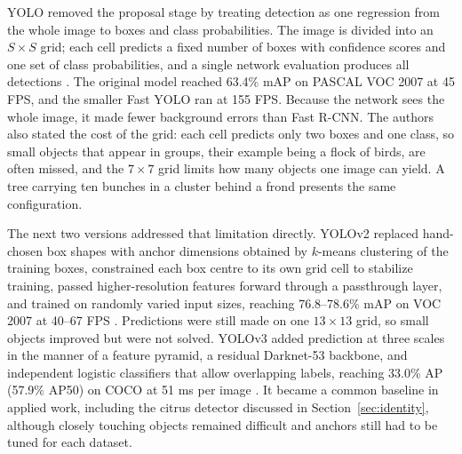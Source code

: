 YOLO removed the proposal stage by treating detection as one regression from the whole image to boxes and class probabilities. The image is divided into an $S\times S$ grid; each cell predicts a fixed number of boxes with confidence scores and one set of class probabilities, and a single network evaluation produces all detections \cite{redmon2016yolo}. The original model reached 63.4\% mAP on PASCAL VOC 2007 at 45 FPS, and the smaller Fast YOLO ran at 155 FPS. Because the network sees the whole image, it made fewer background errors than Fast R-CNN. The authors also stated the cost of the grid: each cell predicts only two boxes and one class, so small objects that appear in groups, their example being a flock of birds, are often missed, and the $7\times7$ grid limits how many objects one image can yield. A tree carrying ten bunches in a cluster behind a frond presents the same configuration.

The next two versions addressed that limitation directly. YOLOv2 replaced hand-chosen box shapes with anchor dimensions obtained by $k$-means clustering of the training boxes, constrained each box centre to its own grid cell to stabilize training, passed higher-resolution features forward through a passthrough layer, and trained on randomly varied input sizes, reaching 76.8--78.6\% mAP on VOC 2007 at 40--67 FPS \cite{redmon2017yolo9000}. Predictions were still made on one $13\times13$ grid, so small objects improved but were not solved. YOLOv3 added prediction at three scales in the manner of a feature pyramid, a residual Darknet-53 backbone, and independent logistic classifiers that allow overlapping labels, reaching 33.0\% AP (57.9\% AP50) on COCO at 51 ms per image \cite{redmon2018yolov3}. It became a common baseline in applied work, including the citrus detector discussed in Section~\ref{sec:identity}, although closely touching objects remained difficult and anchors still had to be tuned for each dataset.

